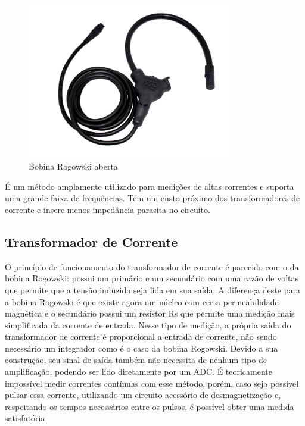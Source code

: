 \begin{figure}[htb]
    \caption{Bobina Rogowski aberta}
    \label{fig:rogowski-bobina}
    \includegraphics[width=0.8\textwidth]{figuras/bobina-rogowski.png}
\end{figure}

É um método amplamente utilizado para medições de altas correntes e suporta uma grande faixa de frequências. Tem um custo próximo dos transformadores de corrente e insere menos impedância parasita no circuito. \citep{curr_sens_tech}

\subsection{Transformador de Corrente}\label{subsec:t-corrente}

O princípio de funcionamento do transformador de corrente é parecido com o da bobina Rogowski: possui um primário e um secundário com uma razão de voltas que permite que a tensão induzida seja lida em sua saída. A diferença deste para a bobina Rogowski é que existe agora um núcleo com certa permeabilidade magnética e o secundário possui um resistor Rs que permite uma medição mais simplificada da corrente de entrada.
Nesse tipo de medição, a própria saída do transformador de corrente é proporcional a entrada de corrente, não sendo necessário um integrador como é o caso da bobina Rogowski. Devido a sua construção, seu sinal de saída também não necessita de nenhum tipo de amplificação, podendo ser lido diretamente por um \gls{ADC}. É teoricamente impossível medir correntes contínuas com esse método, porém, caso seja possível pulsar essa corrente, utilizando um circuito acessório de desmagnetização e, respeitando os tempos necessários entre os pulsos, é possível obter uma medida satisfatória.

